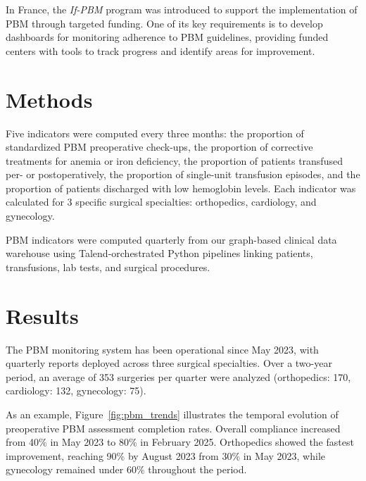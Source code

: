 \documentclass{IOS-Book-Article}
\begin{document}
In France, the \textit{If-PBM} program was introduced to support the implementation of PBM 
through targeted funding.  One of its key requirements is to develop dashboards for monitoring 
adherence to PBM guidelines, providing funded centers with tools to track progress and identify areas
for improvement.

\section{Methods}

Five indicators were computed every three months: the proportion of standardized PBM preoperative check-ups,
 the proportion of corrective treatments for anemia or iron deficiency, the proportion of patients 
 transfused per- or postoperatively, the proportion of single-unit transfusion episodes, and the 
 proportion of patients discharged with low hemoglobin levels. Each indicator was calculated for 3 
 specific surgical specialties: orthopedics, cardiology, and gynecology. 

PBM indicators were computed quarterly from our graph-based clinical data warehouse \cite{Artemova2019}
using Talend-orchestrated Python pipelines linking patients, transfusions, lab tests, and surgical 
procedures.

\section{Results}

The PBM monitoring system has been operational since May 2023, with quarterly 
reports deployed across three surgical specialties. Over a two-year period, an 
average of 353 surgeries per quarter were analyzed (orthopedics: 170, 
cardiology: 132, gynecology: 75).

As an example, Figure~\ref{fig:pbm_trends} illustrates the temporal evolution of preoperative 
PBM assessment completion rates. Overall compliance increased from 40\% in May 
2023 to 80\% in February 2025. Orthopedics showed the fastest improvement, 
reaching 90\% by August 2023 from 30\% in May 2023, while gynecology remained under
60\% throughout the period.
\end{document}
